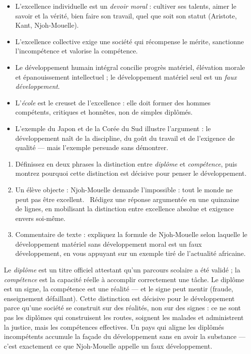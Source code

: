 \documentclass[11pt]{article}
\newcommand{\cle}[1]{{\popxbold\color{popdark}#1}}
\begin{document}
\begin{aretenir}
\begin{itemize}
\item L'\cle{excellence individuelle} est un \emph{devoir moral} : cultiver ses talents, aimer le savoir et la vérité, bien faire son travail, quel que soit son statut (Aristote, Kant, Njoh-Mouelle).
\item L'\cle{excellence collective} exige une société qui récompense le mérite, sanctionne l'incompétence et valorise la compétence.
\item Le \cle{développement humain intégral} concilie progrès matériel, élévation morale et épanouissement intellectuel ; le développement matériel seul est un \emph{faux développement}.
\item L'\emph{école} est le creuset de l'excellence : elle doit former des hommes compétents, critiques et honnêtes, non de simples diplômés.
\item L'exemple du Japon et de la Corée du Sud illustre l'argument : le développement naît de la discipline, du goût du travail et de l'exigence de qualité — mais l'exemple persuade sans démontrer.
\end{itemize}
\end{aretenir}

\begin{exercice}
\begin{enumerate}
\item Définissez en deux phrases la distinction entre \emph{diplôme} et \emph{compétence}, puis montrez pourquoi cette distinction est décisive pour penser le développement.
\item Un élève objecte : \guillemotleft Njoh-Mouelle demande l'impossible : tout le monde ne peut pas être excellent. \guillemotright\ Rédigez une réponse argumentée en une quinzaine de lignes, en mobilisant la distinction entre excellence absolue et exigence envers soi-même.
\item Commentaire de texte : expliquez la formule de Njoh-Mouelle selon laquelle le développement matériel sans développement moral est un faux développement, en vous appuyant sur un exemple tiré de l'actualité africaine.
\end{enumerate}
\end{exercice}

\begin{corrige}[Exercice 1]
Le \emph{diplôme} est un titre officiel attestant qu'un parcours scolaire a été validé ; la \emph{compétence} est la capacité réelle à accomplir correctement une tâche. Le diplôme est un signe, la compétence est une réalité — et le signe peut mentir (fraude, enseignement défaillant). Cette distinction est décisive pour le développement parce qu'une société se construit sur des réalités, non sur des signes : ce ne sont pas les diplômes qui construisent les routes, soignent les malades et administrent la justice, mais les compétences effectives. Un pays qui aligne les diplômés incompétents accumule la façade du développement sans en avoir la substance — c'est exactement ce que Njoh-Mouelle appelle un faux développement.
\end{corrige}
\end{document}
